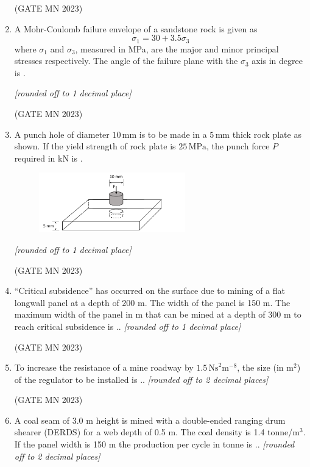 \documentclass[journal]{IEEEtran}
\begin{document}
\begin{enumerate}
\hfill(GATE MN 2023)
\item A Mohr-Coulomb failure envelope of a sandstone rock is given as
\[
\sigma_{1} = 30 + 3.5\sigma_{3}
\]
where $\sigma_{1}$ and $\sigma_{3}$, measured in MPa, are the major and minor principal stresses respectively.  
The angle of the failure plane with the $\sigma_{3}$ axis in degree is \underline{\hspace{2cm}}.  

\textit{[rounded off to 1 decimal place]}


\hfill(GATE MN 2023)
\item A punch hole of diameter $10 \, \text{mm}$ is to be made in a $5 \, \text{mm}$ thick rock plate as shown.  
If the yield strength of rock plate is $25 \, \text{MPa}$, the punch force $P$ required in kN is \underline{\hspace{2cm}}. 


    \begin{figure}[H]
    \centering
\includegraphics[width=0.6\textwidth]{Screenshot_2025_0822_121717.png}
\caption{}
    \label{fig:Q31}
\end{figure}



\textit{[rounded off to 1 decimal place]}   


\hfill(GATE MN 2023)
\item ``Critical subsidence'' has occurred on the surface due to mining of a flat longwall panel at a depth of 200 m. The width of the panel is 150 m. The maximum width of the panel in m that can be mined at a depth of 300 m to reach critical subsidence is \underline{\hspace{2cm}}..  
\textit{[rounded off to 1 decimal place]}


\hfill(GATE MN 2023)
\item To increase the resistance of a mine roadway by $1.5 \,\text{Ns}^2 \text{m}^{-8}$, the size (in m$^2$) of the regulator to be installed is \underline{\hspace{2cm}}..  
\textit{[rounded off to 2 decimal places]}


\hfill(GATE MN 2023)
\item A coal seam of 3.0 m height is mined with a double-ended ranging drum shearer (DERDS) for a web depth of 0.5 m. The coal density is 1.4 tonne/m$^3$. If the panel width is 150 m the production per cycle in tonne is \underline{\hspace{2cm}}..  
\textit{[rounded off to 2 decimal places]}



\end{enumerate}
\end{document}
